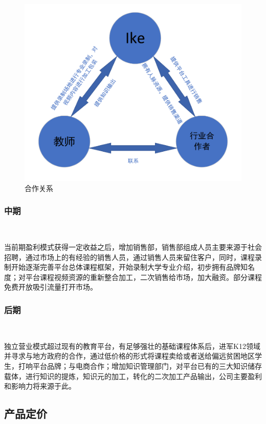 \begin{figure}[H]
	\centering
	\includegraphics[width=0.9\columnwidth]{figures/partnership}
	\caption{合作关系}
	\label{fg:partnership}
\end{figure}

\subsubsection{中期}\

当前期盈利模式获得一定收益之后，增加销售部，销售部组成人员主要来源于社会招聘，通过市场上的有经验的销售人员，通过销售人员来留住客户，同时，课程录制开始逐渐完善平台总体课程框架，开始录制大学专业介绍，初步拥有品牌知名度；对平台课程视频资源的重新整合加工，二次销售给市场，加大融资。部分课程免费开放吸引流量打开市场。

\subsubsection{后期}\

独立营业模式超过现有的教育平台，有足够强壮的基础课程体系后，进军K12领域并寻求与地方政府的合作，通过低价格的形式将课程卖给或者送给偏远贫困地区学生，打响平台品牌；与电商合作；增加知识管理部门，对平台已有的三大知识储存载体，进行知识的提炼，知识元的加工，转化的二次加工产品输出，公司主要盈利和影响力将来源于此。

\subsection{产品定价}

